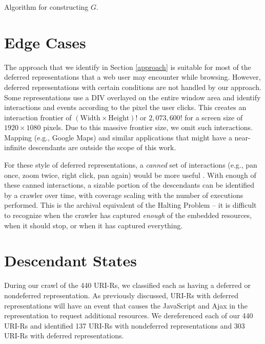 \documentclass{sig-alternate}
\begin{document}
\begin{algorithm}
 \caption{Algorithm for constructing $G$.}
  \label{algo2}
\end{algorithm}


\section{Edge Cases}
\label{edge}
The approach that we identify in Section \ref{approach} is suitable for most of the deferred representations that a web user may encounter while browsing. However, deferred representations with certain conditions are not handled by our approach. Some representations use a DIV overlayed on the entire window area and identify interactions and events according to the pixel the user clicks. This creates an interaction frontier of 
$(\text{Width} \times \text{Height})!$ or $2,073,600!$ 
for a screen size of $1920 \times 1080$ pixels. Due to this massive frontier size, we omit such interactions. Mapping (e.g., Google Maps)  and similar applications that might have a near-infinite descendants are outside the scope of this  work.

For these style of deferred representations, a \emph{canned} set of interactions (e.g., pan once, zoom twice, right click, pan again) would be more useful \cite{seleniumpjs}. With enough of these canned interactions, a sizable portion of the descendants can be identified by a crawler over time, with coverage scaling with the number of executions performed. This is the archival equivalent of the Halting Problem -- it is difficult to recognize when the crawler has captured \emph{enough} of the embedded resources, when it should stop, or when it has captured everything.
\\
\section{Descendant States}
\label{states}
During our crawl of the 440 URI-Rs, we classified each as having a deferred or nondeferred representation. As previously discussed, URI-Rs with deferred representations will have an event that causes the JavaScript and Ajax in the representation to request additional resources. We dereferenced each of our 440 URI-Rs and identified 137 URI-Rs with nondeferred representations and 303 URI-Rs with deferred representations. 
\end{document}
